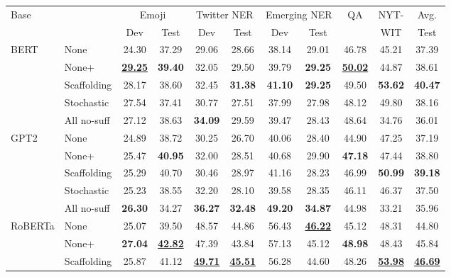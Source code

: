 \begin{table*}
    \centering
    \small
    \begin{tabular}{llccccccccc}
        \toprule
        Base & \tokdetok{} & \multicolumn{2}{c}{Emoji} & \multicolumn{2}{c}{Twitter NER} & \multicolumn{2}{c}{Emerging NER} & QA & NYT- & Avg. \\
        & & Dev & Test & Dev & Test & Dev & Test &  & WIT & Test \\
        \midrule
        BERT & None & 24.30 & 37.29 & 29.06 & 28.66 & 38.14 & 29.01 & 46.78 & 45.21 & 37.39 \\
        & None+\ppt{} & \underline{\textbf{29.25}} & \textbf{39.40} & 32.05 & 29.50 & 39.79 & \textbf{29.25} & \underline{\textbf{50.02}} & 44.87 & 38.61 \\
        & Scaffolding & 28.17 & 38.60 & 32.45 & \textbf{31.38} & \textbf{41.10} & \textbf{29.25} & 49.50 & \textbf{53.62} & \textbf{40.47} \\
        & Stochastic & 27.54 & 37.41 & 30.77 & 27.51 & 37.99 & 27.98 & 48.12 & 49.80 & 38.16 \\
        & All no-suff & 27.12 & 38.63 & \textbf{34.09} & 29.59 & 39.47 & 28.43 & 48.64 & 34.76 & 36.01 \\
        \midrule
        GPT2 & None & 24.89 & 38.72 & 30.25 & 26.70 & 40.06 & 28.40 & 44.90 & 47.25 & 37.19 \\
        & None+\ppt{} & 25.47 & \textbf{40.95} & 32.00 & 28.51 & 40.68 & 29.90 & \textbf{47.18} & 47.44 & 38.80 \\
        & Scaffolding & 25.29 & 40.70 & 30.46 & 28.97 & 41.16 & 28.23 & 46.99 & \textbf{50.99} & \textbf{39.18} \\
        & Stochastic & 25.23 & 38.55 & 32.20 & 28.10 & 39.58 & 28.35 & 46.11 & 46.37 & 37.50 \\
        & All no-suff & \textbf{26.30} & 34.27 & \textbf{36.27} & \textbf{32.48} & \textbf{49.20} & \textbf{34.87} & 44.98 & 33.21 & 35.96 \\
        \midrule
        RoBERTa & None & 25.07 & 39.50 & 48.57 & 44.86 & 56.43 & \underline{\textbf{46.22}} & 45.12 & 48.31 & 44.80 \\
        & None+\ppt{} & \textbf{27.04} & \underline{\textbf{42.82}} & 47.39 & 43.84 & 57.13 & 45.12 & \textbf{48.98} & 48.43 & 45.84 \\
        & Scaffolding & 25.87 & 41.12 & \underline{\textbf{49.71}} & \underline{\textbf{45.51}} & 56.28 & 44.60 & 48.26 & \underline{\textbf{53.98}} & \underline{\textbf{46.69}} \\

\end{tabular}
\end{table*}
